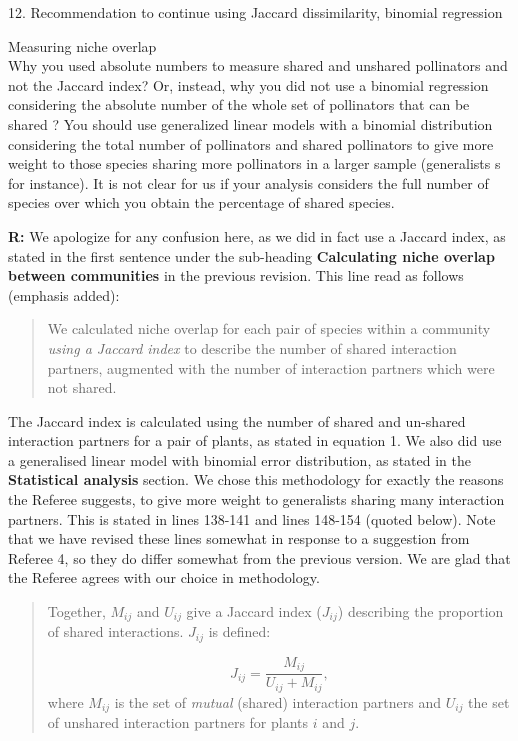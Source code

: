 \documentclass[12pt]{letter}
\newenvironment{refquote}{\bigskip \begin{it}}{\end{it}\smallskip}
\begin{document}
	12. Recommendation to continue using Jaccard dissimilarity, binomial regression

		\begin{refquote}
			Measuring niche overlap\\
			Why you used absolute numbers to measure shared and unshared pollinators and not the Jaccard index? Or, instead, why you did not use a binomial regression considering the absolute number of the whole set of pollinators that can be shared ? You should use generalized linear models with a binomial distribution considering the total number of pollinators and shared pollinators to give more weight to those species sharing more pollinators in a larger sample (generalists s for instance). It is not clear for us if your analysis considers the full number of species over which you obtain the percentage of shared species.
		\end{refquote}

		\textbf{R:} We apologize for any confusion here, as we did in fact use a Jaccard index, as stated in the first  sentence under the sub-heading \textbf{Calculating niche overlap between communities} in the previous revision. This line read as follows (emphasis added): 
		\begin{quotation}
		We calculated niche overlap for each pair of species within a community \emph{using a Jaccard index} to describe the number of shared interaction partners, augmented with the number of interaction partners which were not shared.
		\end{quotation}

		The Jaccard index is calculated using the number of shared and un-shared interaction partners for a pair of plants, as stated in equation 1. We also did use a generalised linear model with binomial error distribution, as stated in the \textbf{Statistical analysis} section. We chose this methodology for exactly the reasons the Referee suggests, to give more weight to generalists sharing many interaction partners. This is stated in lines 138-141 and lines 148-154 (quoted below). Note that we have revised these lines somewhat in response to a suggestion from Referee 4, so they do differ somewhat from the previous version. We are glad that the Referee agrees with our choice in methodology.

		\begin{quotation}

			Together, $M_{ij}$ and $U_{ij}$ give a Jaccard index ($J_{ij}$) describing 
			the proportion of shared interactions. $J_{ij}$ is defined: 

			\begin{equation}
			J_{ij} = \frac{M_{ij}}{U_{ij}+M_{ij}} ,
			\end{equation}
			where $M_{ij}$ is the set of \emph{mutual} (shared) interaction partners and $U_{ij}$ the set of unshared interaction partners for plants $i$ and $j$.

		\end{quotation}
\end{document}
